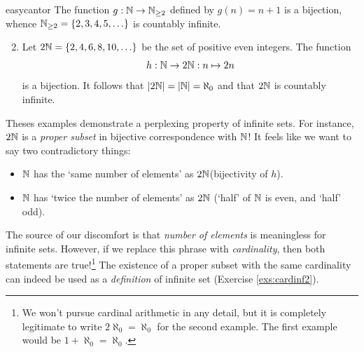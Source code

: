 \begin{examples}{}{easycantor}
	\exstart The function $g:\mathbb{N}\to\mathbb{N}_{\ge 2}$ defined by $g(n)=n+1$ is a bijection, whence $\mathbb{N}_{\ge 2}=\{2,3,4,5,\ldots\}$ is countably infinite.\footnotemark
	\begin{enumerate}\setcounter{enumi}{1}
	  \item Let $2\mathbb{N}=\{2,4,6,8,10,\ldots\}$ be the set of positive even integers. The function
		\[
		h:\mathbb{N}\to 2\mathbb{N}:n\mapsto 2n
		\]
		is a bijection. It follows that $\left| 2\mathbb{N}\right|=\left| \mathbb{N}\right|=\aleph_0$ and that $2\mathbb{N}$ is countably infinite.
	\end{enumerate}
\end{examples}


Theses examples demonstrate a perplexing property of infinite sets. For instance, $2\mathbb{N}$ is a \emph{proper subset} in bijective correspondence with $\mathbb{N}$! It feels like we want to say two contradictory things:
\begin{itemize}
  \item $\mathbb{N}$ has the `same number of elements' as $2\mathbb{N}$\quad (bijectivity of $h$).
  \item $\mathbb{N}$ has `twice the number of elements' as $2\mathbb{N}$ \quad (`half' of $\mathbb{N}$ is even, and `half' odd).
\end{itemize}
The source of our discomfort is that \emph{number of elements} is meaningless for infinite sets. However, if we replace this phrase with \emph{cardinality}, then both statements are true!\footnote{We won't pursue cardinal arithmetic in any detail, but it is completely legitimate to write $2\aleph_0=\aleph_0$ for the second example. The first example would be $1+\aleph_0=\aleph_0$.} The existence of a proper subset with the same cardinality can indeed be used as a \emph{definition} of infinite set (Exercise \ref{exs:cardinf2}).\bigbreak


